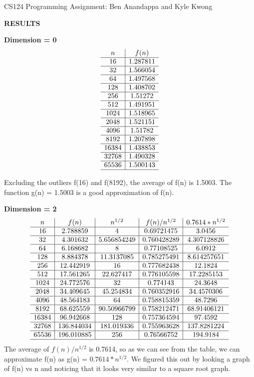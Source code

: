 \documentclass[11pt]{article}
\begin{document}
CS124 Programming Assignment: Ben Anandappa and Kyle Kwong \newline

\textbf{RESULTS}

\textbf{Dimension = 0}
$$
\begin{array}{c|c}
n & f(n)  \\ \hline
16 & 1.287811 \\ \hline
32 & 1.566054 \\ \hline
64 & 1.497568 \\ \hline
128 & 1.408702 \\ \hline
256 & 1.51272 \\ \hline
512 & 1.491951 \\ \hline
1024 & 1.518965 \\ \hline
2048 & 1.521151 \\ \hline
4096 & 1.51782 \\ \hline
8192 & 1.207898 \\ \hline
16384 & 1.438853 \\ \hline
32768 & 1.490328 \\ \hline
65536 & 1.500143 \\ \hline
\end{array}
$$

Excluding the outliers f(16) and f(8192), the average of f(n) is 1.5003. The function g(n) = 1.5003 is a good approximation of f(n).

\textbf{Dimension = 2}
$$
\begin{array}{c|c|c|c|c}
n & f(n) & n^{1/2} & f(n)/n^{1/2}  & 0.7614 * n^{1/2} \\ \hline 
16 & 2.788859 & 4 & 0.69721475  & 3.0456\\ \hline
32 & 4.301632 &  5.656854249 & 0.760428289 & 4.307128826 \\ \hline
64 & 6.168682  & 8 & 0.77108525 & 6.0912\\ \hline
128 & 8.884378 & 11.3137085 &0.785275491 & 8.614257651\\ \hline
256 & 12.442919 & 16 & 0.777682438 & 12.1824\\ \hline
512 & 17.561265  & 22.627417 &0.776105598 & 17.2285153\\ \hline
1024 & 24.772576 & 32 & 0.774143 & 24.3648 \\ \hline
2048 & 34.409645  & 45.254834 & 0.760352916 & 34.4570306 \\ \hline
4096 & 48.564183 & 64 & 0.758815359 & 48.7296 \\ \hline
8192 & 68.625559 & 90.50966799 & 0.758212471 & 68.91406121 \\ \hline
16384 & 96.942668 & 128 & 0.757364594 & 97.4592\\ \hline
32768 & 136.844034 & 181.019336 & 0.755963628 & 137.8281224 \\ \hline
65536 & 196.010885 & 256 & 0.76566752 & 194.9184 \\ \hline
\end{array}
$$
The average of $f(n)/n^{1/2}$ is 0.7614, so as we can see from the table, we can approximate f(n) as g(n) = $0.7614*n^{1/2}$. We figured this out by looking a graph of f(n)  vs n and noticing that it looks very similar to a square root graph. 
\end{document}
